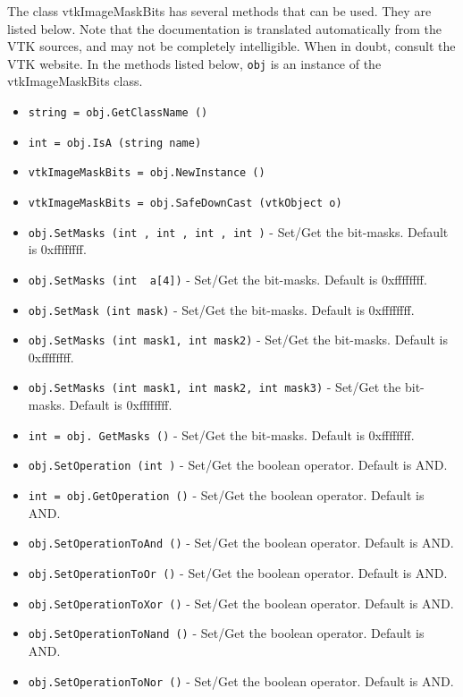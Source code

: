 The class vtkImageMaskBits has several methods that can be used.
  They are listed below.
Note that the documentation is translated automatically from the VTK sources,
and may not be completely intelligible.  When in doubt, consult the VTK website.
In the methods listed below, \verb|obj| is an instance of the vtkImageMaskBits class.
\begin{itemize}
\item  \verb|string = obj.GetClassName ()|

\item  \verb|int = obj.IsA (string name)|

\item  \verb|vtkImageMaskBits = obj.NewInstance ()|

\item  \verb|vtkImageMaskBits = obj.SafeDownCast (vtkObject o)|

\item  \verb|obj.SetMasks (int , int , int , int )| -  Set/Get the bit-masks. Default is 0xffffffff.

\item  \verb|obj.SetMasks (int  a[4])| -  Set/Get the bit-masks. Default is 0xffffffff.

\item  \verb|obj.SetMask (int mask)| -  Set/Get the bit-masks. Default is 0xffffffff.

\item  \verb|obj.SetMasks (int mask1, int mask2)| -  Set/Get the bit-masks. Default is 0xffffffff.

\item  \verb|obj.SetMasks (int mask1, int mask2, int mask3)| -  Set/Get the bit-masks. Default is 0xffffffff.

\item  \verb|int = obj. GetMasks ()| -  Set/Get the bit-masks. Default is 0xffffffff.

\item  \verb|obj.SetOperation (int )| -  Set/Get the boolean operator. Default is AND.

\item  \verb|int = obj.GetOperation ()| -  Set/Get the boolean operator. Default is AND.

\item  \verb|obj.SetOperationToAnd ()| -  Set/Get the boolean operator. Default is AND.

\item  \verb|obj.SetOperationToOr ()| -  Set/Get the boolean operator. Default is AND.

\item  \verb|obj.SetOperationToXor ()| -  Set/Get the boolean operator. Default is AND.

\item  \verb|obj.SetOperationToNand ()| -  Set/Get the boolean operator. Default is AND.

\item  \verb|obj.SetOperationToNor ()| -  Set/Get the boolean operator. Default is AND.

\end{itemize}
